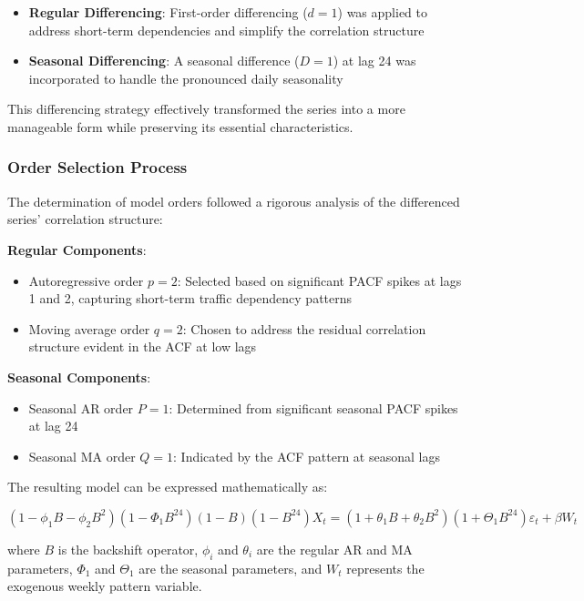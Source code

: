 \documentclass{article}
\begin{document}
\begin{itemize}
    \item \textbf{Regular Differencing}: First-order differencing ($d=1$) was applied to address short-term dependencies and simplify the correlation structure
    \item \textbf{Seasonal Differencing}: A seasonal difference ($D=1$) at lag 24 was incorporated to handle the pronounced daily seasonality
\end{itemize}

This differencing strategy effectively transformed the series into a more manageable form while preserving its essential characteristics.

\subsubsection{Order Selection Process}
The determination of model orders followed a rigorous analysis of the differenced series' correlation structure:

\textbf{Regular Components}:
\begin{itemize}
    \item Autoregressive order $p=2$: Selected based on significant PACF spikes at lags 1 and 2, capturing short-term traffic dependency patterns
    \item Moving average order $q=2$: Chosen to address the residual correlation structure evident in the ACF at low lags
\end{itemize}

\textbf{Seasonal Components}:
\begin{itemize}
    \item Seasonal AR order $P=1$: Determined from significant seasonal PACF spikes at lag 24
    \item Seasonal MA order $Q=1$: Indicated by the ACF pattern at seasonal lags
\end{itemize}

The resulting model can be expressed mathematically as:

\begin{equation}
(1-\phi_1B-\phi_2B^2)(1-\Phi_1B^{24})(1-B)(1-B^{24})X_t = (1+\theta_1B+\theta_2B^2)(1+\Theta_1B^{24})\varepsilon_t + \beta W_t
\end{equation}

where $B$ is the backshift operator, $\phi_i$ and $\theta_i$ are the regular AR and MA parameters, $\Phi_1$ and $\Theta_1$ are the seasonal parameters, and $W_t$ represents the exogenous weekly pattern variable.
\end{document}
